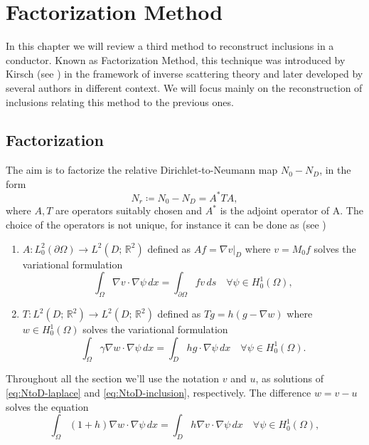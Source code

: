 \documentclass[10pt, a4paper, twoside, openright]{book}
\theoremstyle{definition}
\theoremstyle{plain}
\theoremstyle{plain}
\theoremstyle{plain}
\theoremstyle{plain}
\theoremstyle{plain}
\theoremstyle{plain}
\theoremstyle{plain}
\theoremstyle{plain}
\begin{document}
\chapter{Factorization Method}
\label{ch:factorization}
In this chapter we will review a third method to reconstruct inclusions in a conductor. Known as Factorization Method, 
this technique was introduced by Kirsch (see \cite{kirsch:factorization}) in the framework of inverse scattering theory and later developed by 
several authors in different context. We will focus mainly on the reconstruction of inclusions relating this method to 
the previous ones.
\section{Factorization}
The aim is to factorize the relative Dirichlet-to-Neumann map ${N_0} - {N_D}$, in the form
\begin{equation}
 {N_r}\coloneqq{N_0} - {N_D} = A^*TA,
\end{equation}
where $A,T$ are operators suitably chosen and $A^*$ is the adjoint operator of A. 
The choice of the operators is not unique, for instance it can be done as (see \cite{kirsch:book})
\begin{enumerate}
 \item $A:L^2_0(\partial \Omega) \to L^2(D;\,\mathbb{R}^2)$ defined as $Af = \nabla v|_D$ where $v = M_0f$ solves the variational formulation
 \begin{equation}
  \label{eq:def-A}
  \int_\Omega \nabla v\cdot \nabla \psi \, dx = \int_{\partial \Omega} fv\, ds\quad \forall\psi\in H^1_0(\Omega),
 \end{equation}
 \item $T:L^2(D;\,\mathbb{R}^2) \to L^2(D;\,\mathbb{R}^2)$ defined as $Tg = h(g - \nabla w)$ where $w\in H^1_0(\Omega)$ solves the variational formulation
 \begin{equation}
  \label{eq:def-T}
  \int_\Omega \gamma \nabla w\cdot \nabla \psi \, dx = \int_D hg\cdot\nabla\psi\, dx\quad \forall\psi\in H^1_0(\Omega).
 \end{equation}
\end{enumerate}
Throughout all the section we'll use the notation $v$ and $u$, as solutions of \eqref{eq:NtoD-laplace} and \eqref{eq:NtoD-inclusion}, respectively.
The difference $w = v - u$ solves the equation
\begin{equation}
 \int_\Omega(1+h)\nabla w\cdot\nabla\psi\, dx = \int_D h\nabla v \cdot \nabla \psi\, dx\quad \forall\psi\in H^1_0(\Omega),
\end{equation}
\end{document}
